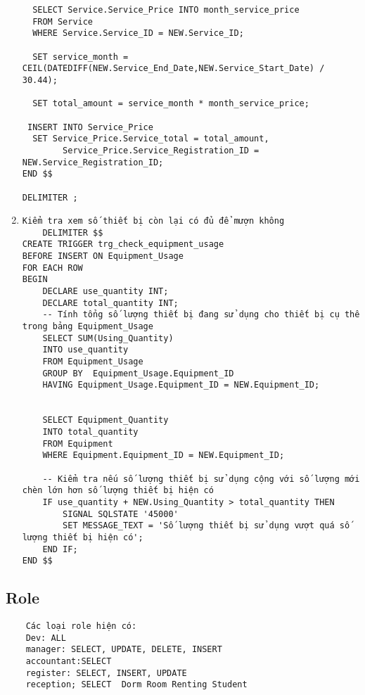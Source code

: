 \documentclass[a4paper,12pt]{article}
\begin{document}
\begin{enumerate}
\begin{verbatim}
  SELECT Service.Service_Price INTO month_service_price
  FROM Service
  WHERE Service.Service_ID = NEW.Service_ID;

  SET service_month = CEIL(DATEDIFF(NEW.Service_End_Date,NEW.Service_Start_Date) / 30.44);

  SET total_amount = service_month * month_service_price;

 INSERT INTO Service_Price 
  SET Service_Price.Service_total = total_amount,
		Service_Price.Service_Registration_ID = NEW.Service_Registration_ID;
END $$

DELIMITER ;
    \end{verbatim}
    \item \begin{verbatim}
Kiểm tra xem số thiết bị còn lại có đủ để mượn không
    DELIMITER $$
CREATE TRIGGER trg_check_equipment_usage
BEFORE INSERT ON Equipment_Usage
FOR EACH ROW
BEGIN
    DECLARE use_quantity INT;
    DECLARE total_quantity INT;
    -- Tính tổng số lượng thiết bị đang sử dụng cho thiết bị cụ thể trong bảng Equipment_Usage
    SELECT SUM(Using_Quantity)
    INTO use_quantity
    FROM Equipment_Usage
    GROUP BY  Equipment_Usage.Equipment_ID
	HAVING Equipment_Usage.Equipment_ID = NEW.Equipment_ID;


    SELECT Equipment_Quantity
    INTO total_quantity
    FROM Equipment
    WHERE Equipment.Equipment_ID = NEW.Equipment_ID;

    -- Kiểm tra nếu số lượng thiết bị sử dụng cộng với số lượng mới chèn lớn hơn số lượng thiết bị hiện có
    IF use_quantity + NEW.Using_Quantity > total_quantity THEN
        SIGNAL SQLSTATE '45000'
        SET MESSAGE_TEXT = 'Số lượng thiết bị sử dụng vượt quá số lượng thiết bị hiện có';
    END IF;
END $$
    \end{verbatim}
\end{enumerate}

\subsection{Role}
\begin{verbatim}
    Các loại role hiện có:
    Dev: ALL
    manager: SELECT, UPDATE, DELETE, INSERT
    accountant:SELECT 
    register: SELECT, INSERT, UPDATE
    reception; SELECT  Dorm Room Renting Student

\end{verbatim}
\end{document}
